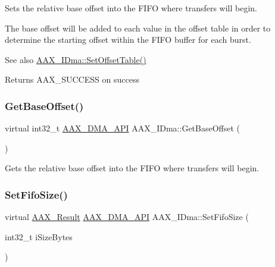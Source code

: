 Sets the relative base offset into the F\+I\+FO where transfers will begin. 

The base offset will be added to each value in the offset table in order to determine the starting offset within the F\+I\+FO buffer for each burst.

\begin{DoxySeeAlso}{See also}
\mbox{\hyperlink{a01809_a9a106088088a8fc812b137bd90c0fa3a}{A\+A\+X\+\_\+\+I\+Dma\+::\+Set\+Offset\+Table()}}
\end{DoxySeeAlso}
\begin{DoxyReturn}{Returns}
{\ttfamily A\+A\+X\+\_\+\+S\+U\+C\+C\+E\+SS} on success 
\end{DoxyReturn}
\mbox{\label{a01809_a1f6ce2d66bb6c26fa4e7e70821e8bd2d}} 
\subsubsection{\texorpdfstring{GetBaseOffset()}{GetBaseOffset()}}
{\footnotesize\ttfamily virtual int32\+\_\+t \mbox{\hyperlink{a00587_acae60d01e5e4bd3282369d0d9d378f3f}{A\+A\+X\+\_\+\+D\+M\+A\+\_\+\+A\+PI}} A\+A\+X\+\_\+\+I\+Dma\+::\+Get\+Base\+Offset (\begin{DoxyParamCaption}{ }\end{DoxyParamCaption})\hspace{0.3cm}{\ttfamily [pure virtual]}}



Gets the relative base offset into the F\+I\+FO where transfers will begin. 

\mbox{\label{a01809_a98f731e4c7c60a3b6b969fd699448224}} 
\subsubsection{\texorpdfstring{SetFifoSize()}{SetFifoSize()}}
{\footnotesize\ttfamily virtual \mbox{\hyperlink{a00392_a4d8f69a697df7f70c3a8e9b8ee130d2f}{A\+A\+X\+\_\+\+Result}} \mbox{\hyperlink{a00587_acae60d01e5e4bd3282369d0d9d378f3f}{A\+A\+X\+\_\+\+D\+M\+A\+\_\+\+A\+PI}} A\+A\+X\+\_\+\+I\+Dma\+::\+Set\+Fifo\+Size (\begin{DoxyParamCaption}\item[{int32\+\_\+t}]{i\+Size\+Bytes }\end{DoxyParamCaption})\hspace{0.3cm}{\ttfamily [pure virtual]}}



